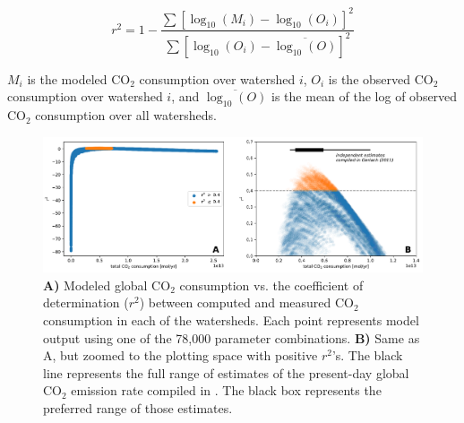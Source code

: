 \documentclass[11pt,letterpaper]{article}
\newcommand{\COtwo}{CO$_{2}$\xspace}
\begin{document}
\begin{equation}
    r^{2} = 1 - \frac{\sum\left[ \log_{10}(M_{i}) - \log_{10}(O_{i}) \right]^{2}}{\sum\left[ \log_{10}(O_{i}) - \overline{\log_{10}(O)} \right]^{2}}
    \label{eq:10}
\end{equation}

\noindent
$M_{i}$ is the modeled \COtwo consumption over watershed $i$, $O_{i}$ is the observed \COtwo consumption over watershed $i$, and $\overline{\log_{10}(O)}$ is the mean of the log of observed \COtwo consumption over all watersheds.

\begin{figure}[h!]
    \centering
    \includegraphics[width=1\textwidth]{Manuscript/Figures/W_vs_r2.pdf}
    \caption{\textbf{A)} Modeled global \COtwo consumption vs. the coefficient of determination ($r^{2}$) between computed and measured \COtwo consumption in each of the watersheds. Each point represents model output using one of the 78,000 parameter combinations. \textbf{B)} Same as A, but zoomed to the plotting space with positive $r^{2}$'s. The black line represents the full range of estimates of the present-day global CO$_{2}$ emission rate compiled in \citet{Gerlach2011a}. The black box represents the preferred range of those estimates.}
    \label{fig:W_vs_r2}
\end{figure}
\end{document}
